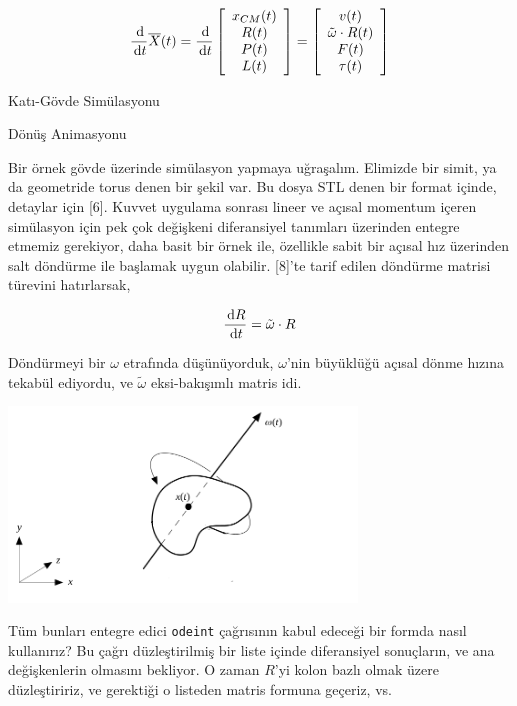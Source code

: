 \documentclass[12pt,fleqn]{article}\usepackage{../../common}
\begin{document}
$$
\frac{\,\mathrm{d}}{\,\mathrm{d} t} \overline{X}(t) =
\frac{\,\mathrm{d}}{\,\mathrm{d} t}
\left[\begin{array}{c}
x_{CM}(t) \\ R(t) \\ P(t) \\ L(t)
\end{array}\right]
=
\left[\begin{array}{c}
v(t) \\ \tilde \omega \cdot R(t) \\ F(t) \\ \tau(t)
\end{array}\right]
$$

Katı-Gövde Simülasyonu

Dönüş Animasyonu

Bir örnek gövde üzerinde simülasyon yapmaya uğraşalım. Elimizde bir simit, ya da
geometride torus denen bir şekil var. Bu dosya STL denen bir format içinde,
detaylar için [6]. Kuvvet uygulama sonrası lineer ve açısal momentum içeren
simülasyon için pek çok değişkeni diferansiyel tanımları üzerinden entegre
etmemiz gerekiyor, daha basit bir örnek ile, özellikle sabit bir açısal hız
üzerinden salt döndürme ile başlamak uygun olabilir. [8]'te tarif edilen
döndürme matrisi türevini hatırlarsak,

$$
\frac{\,\mathrm{d} R}{\,\mathrm{d} t} = \tilde \omega \cdot R
$$

Döndürmeyi bir $\omega$ etrafında düşünüyorduk, $\omega$'nin büyüklüğü
açısal dönme hızına tekabül ediyordu, ve $\tilde \omega$ eksi-bakışımlı
matris idi.

\includegraphics[width=25em]{compscieng_bpp32sim_rigbod_01.png}

Tüm bunları entegre edici \verb!odeint! çağrısının kabul edeceği bir formda
nasıl kullanırız? Bu çağrı düzleştirilmiş bir liste içinde diferansiyel
sonuçların, ve ana değişkenlerin olmasını bekliyor. O zaman $R$'yi kolon bazlı
olmak üzere düzleştiririz, ve gerektiği o listeden matris formuna geçeriz, vs.
\end{document}
